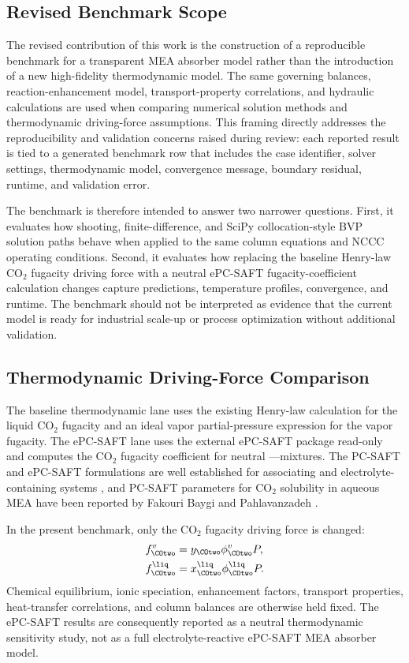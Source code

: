     \subsection{Revised Benchmark Scope}
        The revised contribution of this work is the construction of a reproducible benchmark for a transparent MEA absorber model rather than the introduction of a new high-fidelity thermodynamic model. The same governing balances, reaction-enhancement model, transport-property correlations, and hydraulic calculations are used when comparing numerical solution methods and thermodynamic driving-force assumptions. This framing directly addresses the reproducibility and validation concerns raised during review: each reported result is tied to a generated benchmark row that includes the case identifier, solver settings, thermodynamic model, convergence message, boundary residual, runtime, and validation error.

        The benchmark is therefore intended to answer two narrower questions. First, it evaluates how shooting, finite-difference, and SciPy collocation-style BVP solution paths behave when applied to the same column equations and NCCC operating conditions. Second, it evaluates how replacing the baseline Henry-law CO$_2$ fugacity driving force with a neutral ePC-SAFT fugacity-coefficient calculation changes capture predictions, temperature profiles, convergence, and runtime. The benchmark should not be interpreted as evidence that the current model is ready for industrial scale-up or process optimization without additional validation.

    \subsection{Thermodynamic Driving-Force Comparison}
        The baseline thermodynamic lane uses the existing Henry-law calculation for the liquid CO$_2$ fugacity and an ideal vapor partial-pressure expression for the vapor fugacity. The ePC-SAFT lane uses the external ePC-SAFT package read-only and computes the CO$_2$ fugacity coefficient for neutral \COtwo--\MEA--\HtwoO mixtures. The PC-SAFT and ePC-SAFT formulations are well established for associating and electrolyte-containing systems \cite{Gross2001PC-SAFT:Molecules,Cameretti2005ModelingOriginal}, and PC-SAFT parameters for CO$_2$ solubility in aqueous MEA have been reported by Fakouri Baygi and Pahlavanzadeh \cite{FakouriBaygi2015ApplicationSolutions}.

        In the present benchmark, only the CO$_2$ fugacity driving force is changed:
        \begin{align}
            f_{\COtwo}^{v} &= y_{\COtwo}\phi_{\COtwo}^{v}P,\\
            f_{\COtwo}^{\liq} &= x_{\COtwo}^{\liq}\phi_{\COtwo}^{\liq}P.
        \end{align}
        Chemical equilibrium, ionic speciation, enhancement factors, transport properties, heat-transfer correlations, and column balances are otherwise held fixed. The ePC-SAFT results are consequently reported as a neutral thermodynamic sensitivity study, not as a full electrolyte-reactive ePC-SAFT MEA absorber model.

